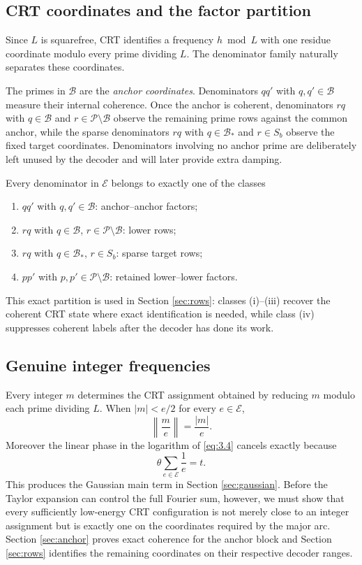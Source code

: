 \subsection{CRT coordinates and the factor partition}

Since $L$ is squarefree, CRT identifies a frequency $h\bmod L$ with one residue coordinate modulo every prime dividing $L$. The denominator family naturally separates these coordinates.

The primes in $\mathcal B$ are the \emph{anchor coordinates}. Denominators $qq'$ with $q,q'\in\mathcal B$ measure their internal coherence. Once the anchor is coherent, denominators $rq$ with $q\in\mathcal B$ and $r\in\mathcal P\setminus\mathcal B$ observe the remaining prime rows against the common anchor, while the sparse denominators $rq$ with $q\in\mathcal B_*$ and $r\in S_b$ observe the fixed target coordinates. Denominators involving no anchor prime are deliberately left unused by the decoder and will later provide extra damping.

Every denominator in $\mathcal E$ belongs to exactly one of the classes
\begin{enumerate}[label=\textup{(\roman*)}]
\item $qq'$ with $q,q'\in\mathcal B$: anchor--anchor factors;
\item $rq$ with $q\in\mathcal B$, $r\in\mathcal P\setminus\mathcal B$: lower rows;
\item $rq$ with $q\in\mathcal B_*$, $r\in S_b$: sparse target rows;
\item $pp'$ with $p,p'\in\mathcal P\setminus\mathcal B$: retained lower--lower factors.
\end{enumerate}
This exact partition is used in Section \ref{sec:rows}: classes (i)--(iii) recover the coherent CRT state where exact identification is needed, while class (iv) suppresses coherent labels after the decoder has done its work.

\subsection{Genuine integer frequencies}

Every integer $m$ determines the CRT assignment obtained by reducing $m$ modulo each prime dividing $L$. When $|m|<e/2$ for every $e\in\mathcal E$,
\[
\left\|\frac{m}{e}\right\|=\frac{|m|}{e}.
\tag{3.7}\label{eq:3.7}
\]
Moreover the linear phase in the logarithm of \eqref{eq:3.4} cancels exactly because
\[
\theta\sum_{e\in\mathcal E}\frac1e=t.
\tag{3.8}\label{eq:3.8}
\]
This produces the Gaussian main term in Section \ref{sec:gaussian}. Before the Taylor expansion can control the full Fourier sum, however, we must show that every sufficiently low-energy CRT configuration is not merely close to an integer assignment but is exactly one on the coordinates required by the major arc. Section \ref{sec:anchor} proves exact coherence for the anchor block and Section \ref{sec:rows} identifies the remaining coordinates on their respective decoder ranges.

